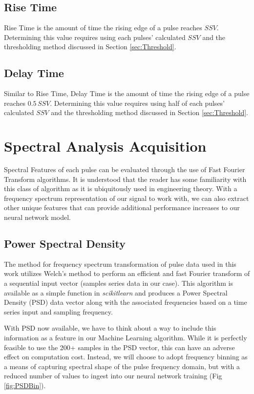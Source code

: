 \documentclass[conference]{IEEEtran}
\begin{document}
\subsection{Rise Time}
Rise Time is the amount of time the rising edge of a pulse reaches $SSV$. Determining this value requires using each pulses' calculated $SSV$ and the thresholding method discussed in Section \ref{sec:Threshold}.

\subsection{Delay Time}
Similar to Rise Time, Delay Time is the amount of time the rising edge of a pulse reaches $0.5\,SSV$. Determining this value requires using half of each pulses' calculated $SSV$ and the thresholding method discussed in Section \ref{sec:Threshold}.



\section{Spectral Analysis Acquisition}
Spectral Features of each pulse can be evaluated through the use of Fast Fourier Transform algorithms. It is understood that the reader has some familiarity with this class of algorithm as it is ubiquitously used in engineering theory. With a frequency spectrum representation of our signal to work with, we can also extract other unique features that can provide additional performance increases to our neural network model.

\subsection{Power Spectral Density}
The method for frequency spectrum transformation of pulse data used in this work utilizes Welch's method \cite{welch1967} to perform an efficient and fast Fourier transform of a sequential input vector (samples series data in our case). This algorithm is available as a simple function in \textit{scikitlearn} and produces a Power Spectral Density (PSD) data vector along with the associated frequencies based on a time series input and sampling frequency.

With PSD now available, we have to think about a way to include this information as a feature in our Machine Learning algorithm. While it is perfectly feasible to use the 200+ samples in the PSD vector, this can have an adverse effect on computation cost. Instead, we will choose to adopt frequency binning as a means of capturing spectral shape of the pulse frequency domain, but with a reduced number of values to ingest into our neural network training (Fig \ref{fig:PSDBin}).
\end{document}
